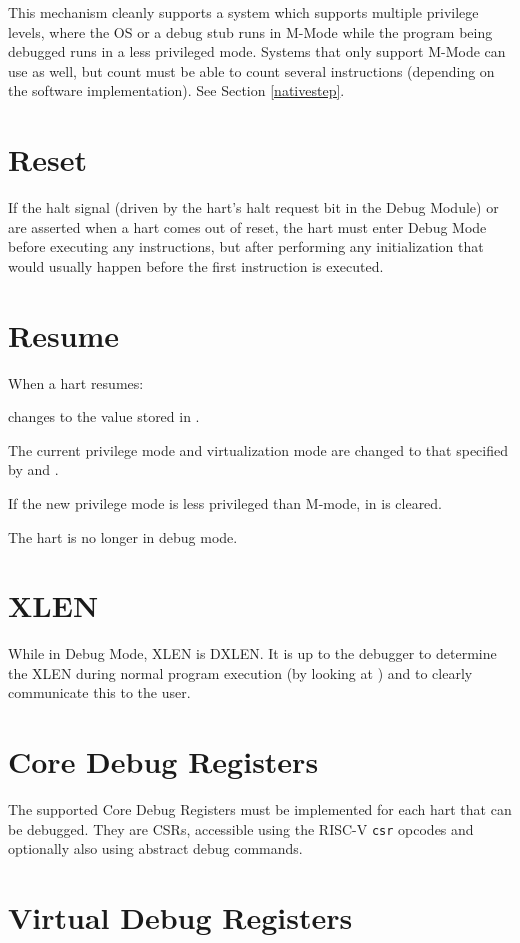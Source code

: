 This mechanism cleanly supports a system which supports multiple privilege
levels, where the OS or a debug stub runs in M-Mode while the program being
debugged runs in a less privileged mode. Systems that only support M-Mode can
use \RcsrIcount as well, but count must be able to count several instructions
(depending on the software implementation). See Section \ref{nativestep}.

\section{Reset}

If the halt signal (driven by the hart's halt request bit in the Debug Module)
or \Fresethaltreq are asserted when a hart comes out of reset, the hart must
enter Debug Mode before executing any instructions, but after performing any
initialization that would usually happen before the first instruction is
executed.

\section{Resume}

\begin{steps}{When a hart resumes:}
    \item \Rpc changes to the value stored in \RcsrDpc.
    \item The current privilege mode and virtualization mode are changed to that specified by
        \FcsrDcsrPrv and \FcsrDcsrV.
    \item If the new privilege mode is less privileged than M-mode,
        \FcsrMstatusMprv in \Rmstatus is cleared.
    \item The hart is no longer in debug mode.
\end{steps}

\section{XLEN}

While in Debug Mode, XLEN is DXLEN. It is up to the debugger to determine the
XLEN during normal program execution (by looking at \Rmisa) and to clearly
communicate this to the user.

\section{Core Debug Registers} \label{debreg}

The supported Core Debug Registers must be implemented for each hart that can
be debugged. They are CSRs, accessible using the RISC-V {\tt csr} opcodes and
optionally also using abstract debug commands.



\section{Virtual Debug Registers} \label{virtreg}


